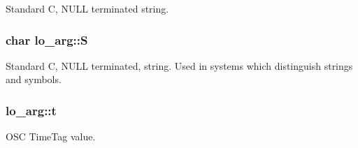 \-Standard \-C, \-N\-U\-L\-L terminated string. \hypertarget{unionlo__arg_ab9c6a9c09ea094d58f889ed1a5edba0b}{
\subsubsection[{\-S}]{\setlength{\rightskip}{0pt plus 5cm}char {\bf lo\-\_\-arg\-::\-S}}}\label{unionlo__arg_ab9c6a9c09ea094d58f889ed1a5edba0b}
\-Standard \-C, \-N\-U\-L\-L terminated, string. \-Used in systems which distinguish strings and symbols. \hypertarget{unionlo__arg_afc89e5569fba7a660638839366b17408}{
\subsubsection[{t}]{ {\bf lo\-\_\-arg\-::t}}}\label{unionlo__arg_afc89e5569fba7a660638839366b17408}
\-O\-S\-C \-Time\-Tag value. 